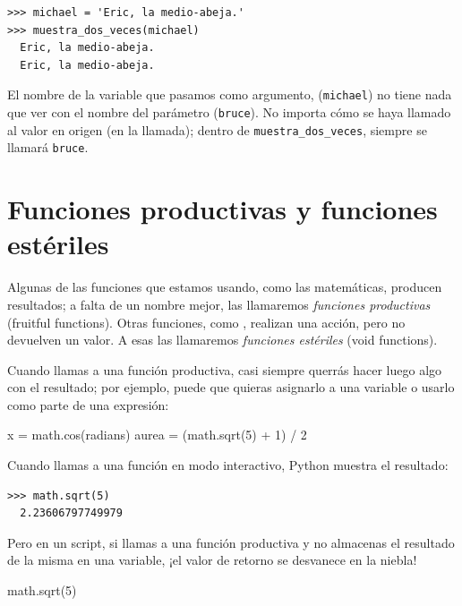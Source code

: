 \begin{Verbatim}[frame=single]
>>> michael = 'Eric, la medio-abeja.'
>>> muestra_dos_veces(michael)
  Eric, la medio-abeja.
  Eric, la medio-abeja.
\end{Verbatim}

El nombre de la variable que pasamos como argumento, (\texttt{michael})
no tiene nada que ver con el nombre del parámetro (\texttt{bruce}). No
importa cómo se haya llamado al valor en origen (en la llamada); dentro
de \texttt{muestra\_dos\_veces}, siempre se llamará \texttt{bruce}.

\hypertarget{funciones-productivas-y-funciones-estuxe9riles}{%
\section{Funciones productivas y funciones
estériles}\label{funciones-productivas-y-funciones-estuxe9riles}}

 
 

Algunas de las funciones que estamos usando, como las matemáticas,
producen resultados; a falta de un nombre mejor, las llamaremos
\emph{funciones productivas} (fruitful functions). Otras funciones, como
, realizan una acción, pero no devuelven un
valor. A esas las llamaremos \emph{funciones estériles} (void
functions).

Cuando llamas a una función productiva, casi siempre querrás hacer luego
algo con el resultado; por ejemplo, puede que quieras asignarlo a una
variable o usarlo como parte de una expresión:

\begin{python}[frame=single]
x = math.cos(radians)
aurea = (math.sqrt(5) + 1) / 2
\end{python}

Cuando llamas a una función en modo interactivo, Python muestra el
resultado:

\begin{Verbatim}[frame=single]
>>> math.sqrt(5)
  2.23606797749979
\end{Verbatim}

Pero en un script, si llamas a una función productiva y no almacenas el
resultado de la misma en una variable, ¡el valor de retorno se desvanece
en la niebla!

\begin{python}[frame=single]
math.sqrt(5)
\end{python}

